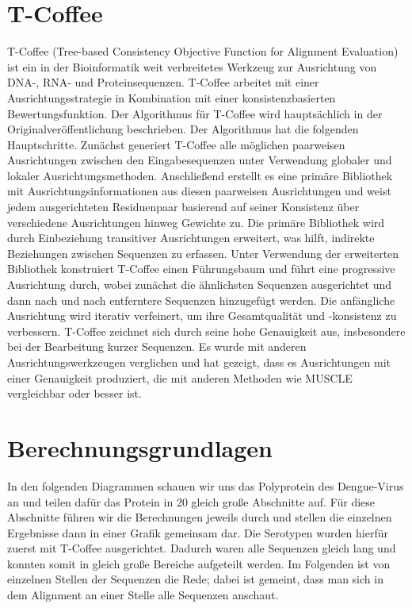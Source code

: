 \documentclass[german,version-2022-01]{uzl-thesis}
\begin{document}
\section{T-Coffee}
T-Coffee (Tree-based Consistency Objective Function for Alignment Evaluation) ist ein in der Bioinformatik weit verbreitetes Werkzeug zur Ausrichtung von DNA-, RNA- und Proteinsequenzen. T-Coffee arbeitet mit einer Ausrichtungsstrategie in Kombination mit einer konsistenzbasierten Bewertungsfunktion. Der Algorithmus f\"ur T-Coffee wird haupts\"achlich in der Originalver\"offentlichung  \cite{poirot_tcoffeeigs_2003} beschrieben. Der Algorithmus hat die folgenden Hauptschritte. Zun\"achst generiert T-Coffee alle m\"oglichen paarweisen Ausrichtungen zwischen den Eingabesequenzen unter Verwendung globaler und lokaler Ausrichtungsmethoden. Anschlie\ss{}end erstellt es eine prim\"are Bibliothek mit Ausrichtungsinformationen aus diesen paarweisen Ausrichtungen und weist jedem ausgerichteten Residuenpaar basierend auf seiner Konsistenz \"uber verschiedene Ausrichtungen hinweg Gewichte zu. Die prim\"are Bibliothek wird durch Einbeziehung transitiver Ausrichtungen erweitert, was hilft, indirekte Beziehungen zwischen Sequenzen zu erfassen. Unter Verwendung der erweiterten Bibliothek konstruiert T-Coffee einen F\"uhrungsbaum und f\"uhrt eine progressive Ausrichtung durch, wobei zun\"achst die \"ahnlichsten Sequenzen ausgerichtet und dann nach und nach entferntere Sequenzen hinzugef\"ugt werden. Die anf\"angliche Ausrichtung wird iterativ verfeinert, um ihre Gesamtqualit\"at und -konsistenz zu verbessern.
T-Coffee zeichnet sich durch seine hohe Genauigkeit aus, insbesondere bei der Bearbeitung kurzer Sequenzen. Es wurde mit anderen Ausrichtungswerkzeugen verglichen und hat gezeigt, dass es Ausrichtungen mit einer Genauigkeit produziert, die mit anderen Methoden wie MUSCLE \cite{Edgar2004MUSCLEL} vergleichbar oder besser ist.

\section{Berechnungsgrundlagen}
In den folgenden Diagrammen schauen wir uns das Polyprotein des Dengue-Virus an und teilen daf\"ur das Protein in 20 gleich gro\ss{}e Abschnitte auf. F\"ur diese Abschnitte f\"uhren wir die Berechnungen jeweils durch und stellen die einzelnen Ergebnisse dann in einer Grafik gemeinsam dar. Die Serotypen wurden hierf\"ur zuerst mit T-Coffee ausgerichtet. Dadurch waren alle Sequenzen gleich lang und konnten somit in gleich gro\ss{}e Bereiche aufgeteilt werden. Im Folgenden ist von einzelnen Stellen der Sequenzen die Rede; dabei ist gemeint, dass man sich in dem Alignment an einer Stelle alle Sequenzen anschaut. 
\end{document}
